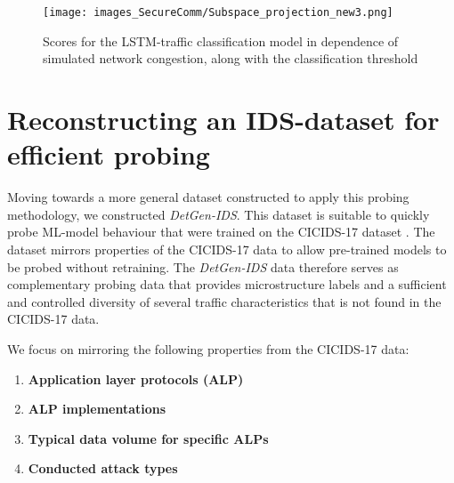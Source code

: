 \begin{figure}
\centering
\texttt{[image: images\_SecureComm/Subspace\_projection\_new3.png]}
\caption{Scores for the LSTM-traffic classification model in dependence of simulated network congestion, along with the classification threshold}\label{fig:Subspace_projection}
\end{figure}


\section{Reconstructing an IDS-dataset for efficient probing}\label{Sec:ProbData}


Moving towards a more general dataset constructed to apply this probing methodology, 
we constructed \textit{DetGen-IDS}. This dataset is suitable to quickly probe ML-model behaviour that were trained on the CICIDS-17 dataset \cite{sharafaldin2018toward}. The dataset mirrors properties of the CICIDS-17 data to allow pre-trained models to be probed without retraining.
The \textit{DetGen-IDS} data therefore serves as complementary probing data that provides microstructure labels and a sufficient and controlled diversity of several traffic characteristics that is not found in the CICIDS-17 data.

We focus on mirroring the following properties from the CICIDS-17 data:
\begin{enumerate}

\item \textbf{Application layer protocols (ALP)}
\item \textbf{ALP implementations}
\item \textbf{Typical data volume for specific ALPs}
\item \textbf{Conducted attack types}

\end{enumerate}

